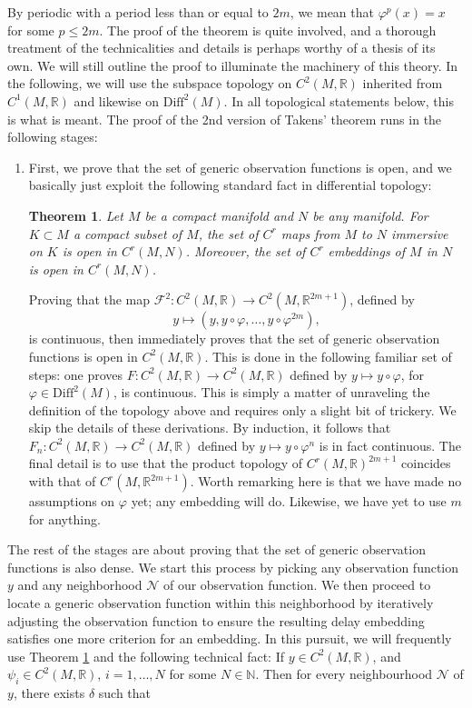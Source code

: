 \documentclass[11pt, a4paper]{memoir}
\theoremstyle{break}
\newtheorem{thm}{Theorem}
\theoremstyle{break}
\theoremstyle{nonumberplain}
\newcommand{\mN}{\mathbb{N}}
\newcommand{\mR}{\mathbb{R}}
\begin{document}
By periodic with a period less than or equal to $2m$, we mean that $\varphi^{p}(x)=x$ for some $p\leqslant 2m$. The proof of the theorem is quite involved, and a thorough treatment of the technicalities and details is perhaps worthy of a thesis of its own. We will still outline the proof to illuminate the machinery of this theory. In the following, we will use the subspace topology on $C^2(M,\mR)$ inherited from $C^1(M,\mR)$ and likewise on $\text{Diff}^2(M)$. In all topological statements below, this is what is meant. The proof of the 2nd version of Takens' theorem runs in the following stages:
\begin{enumerate}[label=(\roman*)]
	\item First, we prove that the set of generic observation functions is open, and we basically just exploit the following standard fact in differential topology:
	\begin{thm}\label{tool}
	Let $M$ be a compact manifold and $N$ be any manifold. For $K\subset M$ a compact subset of $M$, the set of $C^r$ maps from $M$ to $N$ immersive on $K$ is open in $C^r(M,N)$. Moreover, the set of $C^r$ embeddings of $M$ in $N$ is open in $C^r(M,N)$. \cite{hirsch}
	\end{thm}
	Proving that the map $\mathcal{F}^2: C^2(M,\mR)\to C^2(M,\mR^{2m+1})$, defined by $$y\mapsto (y,y\circ\varphi,\ldots, y\circ \varphi^{2m}),$$ 
	is continuous, then immediately proves that the set of generic observation functions is open in $C^2(M,\mR)$. This is done in the following familiar set of steps: one proves $F: C^2(M,\mR)\to C^2(M,\mR)$ defined by $y\mapsto y\circ\varphi$, for $\varphi\in \text{Diff}^2(M)$, is continuous. This is simply a matter of unraveling the definition of the topology above and requires only a slight bit of trickery. We skip the details of these derivations. By induction, it follows that $F_n:  C^2(M,\mR)\to C^2(M,\mR)$ defined by $y\mapsto y\circ\varphi^n$ is in fact continuous.  The final detail is to use that the product topology of $C^r(M,\mR)^{2m+1}$ coincides with that of $C^r(M,\mR^{2m+1})$. Worth remarking here is that we have made no assumptions on $\varphi$ yet; any embedding will do. Likewise, we have yet to use $m$ for anything. 
\end{enumerate}
The rest of the stages are about proving that the set of generic observation functions is also dense. We start this process by picking any observation function $y$ and any neighborhood $\mathcal{N}$ of our observation function. We then proceed to locate a generic observation function within this neighborhood by iteratively adjusting the observation function to ensure the resulting delay embedding satisfies one more criterion for an embedding. In this pursuit, we will frequently use Theorem \ref{tool} and the following technical fact: If $y\in C^2(M,\mR)$, and $\psi_i\in C^2(M,\mR)$, $i=1,\ldots,N$ for some $N\in \mN$. Then for every neighbourhood $\mathcal{N}$ of $y$, there exists $\delta$ such that
\end{document}
